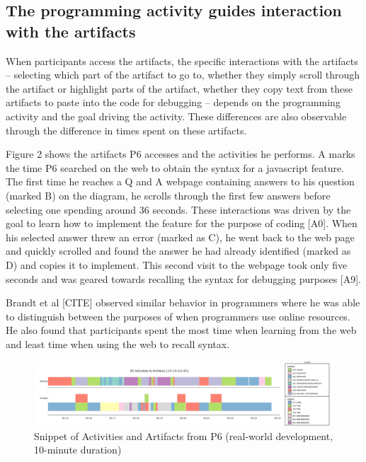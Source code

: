 \subsection{The programming activity guides interaction with the artifacts}

When participants access the artifacts, the specific interactions with the artifacts -- selecting which part of the artifact to go to, whether they simply scroll through the artifact or highlight parts of the artifact, whether they copy text from these artifacts to paste into the code for debugging -- depends on the programming activity and the goal driving the activity. These differences are also observable through the difference in times spent on these artifacts.

Figure 2 shows the artifacts P6 accesses and the activities he performs. A marks the time P6 searched on the web to obtain the syntax for a javascript feature. The first time he reaches a Q and A webpage containing answers to his question (marked B) on the diagram, he scrolls through the first few answers before selecting one spending around 36 seconds. These interactions was driven by the goal to learn how to implement the feature for the purpose of coding [A0]. When his selected answer threw an error (marked as C), he went back to the web page and quickly scrolled and found the answer he had already identified (marked as D) and copies it to implement. This second visit to the webpage took only five seconds and was geared towards recalling the syntax for debugging purposes [A9]. 

Brandt et al [CITE] observed similar behavior in programmers where he was able to distinguish between the purposes of when programmers use online resources. He also found that participants spent the most time when learning from the web and least time when using the web to recall syntax.

\begin{figure}
\includegraphics[width=\textwidth]{figures/P6timeplot}
\caption{Snippet of Activities and Artifacts from P6 (real-world development, 10-minute duration)}
\end{figure}


